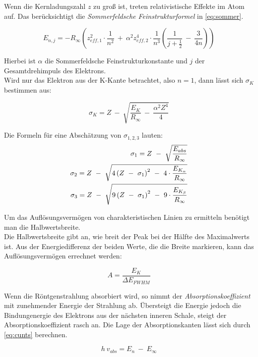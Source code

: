 Wenn die Kernladungszahl $z$ zu groß ist, treten relativistische Effekte im Atom auf.
Das berücksichtigt die \textit{Sommerfeldsche Feinstrukturformel} in \autoref{eq:sommer}.

\begin{equation}
    E_{n,j} = -R_{\infty}\left(z_{eff,1}^2\cdot \frac{1}{n^2}\ +\ \alpha^2z_{eff,2}^4\cdot\frac{1}{n^3}\left(\frac{1}{j+\frac{1}{2}}\ -\ \frac{3}{4n}\right)\right)
    \label{eq:sommer}
\end{equation}

Hierbei ist $\alpha$ die Sommerfeldsche Feinstrukturkonstante und $j$ der Gesamtdrehimpuls des Elektrons.\\
Wird nur das Elektron aus der K-Kante betrachtet, also $n=1$, dann lässt sich $\sigma_K$ bestimmen aus:

\begin{equation}
    \sigma_K = Z\ -\ \sqrt{\frac{E_K}{R_{\infty}}\ -\ \frac{\alpha^2Z^4}{4}}
    \label{eq:sigma}
\end{equation}

Die Formeln für eine Abschätzung von $\sigma_{1,2,3}$ lauten:
\begin{align}
    \sigma_1 = Z\ -\ \sqrt{\frac{E_{abs}}{R_{\infty}}} \notag \\
    \sigma_2 = Z\ -\ \sqrt{4\left(Z\ -\ \sigma_1\right)^2\ -\ 4\cdot \frac{E_{K_{\alpha}}}{R_{\infty}}} \label{sigma1}\\
    \sigma_3 = Z\ -\ \sqrt{9\left(Z\ -\ \sigma_1\right)^2\ -\ 9\cdot \frac{E_{K_{\beta}}}{R_{\infty}}} \notag
\end{align}

Um das Auflösungsvermögen von charakteristischen Linien zu ermitteln benötigt man die Halbwertsbreite.\\
Die Halbwertsbreite gibt an, wie breit der Peak bei der Hälfte des Maximalwerts ist. 
Aus der Energiedifferenz der beiden Werte, die die Breite markieren, kann das Auflösungsvermögen errechnet werden:

\begin{equation}
    A = \frac{E_K}{\Delta E_{FWHM}}
    \label{eq:aufloes}
\end{equation}

Wenn die Röntgenstrahlung absorbiert wird, so nimmt der \textit{Absorptionskoeffizient} mit zunehmender Energie der Strahlung ab.
Übersteigt die Energie jedoch die Bindungenergie des Elektrons aus der nächsten inneren Schale, steigt der Absorptionskoeffizient rasch an.
Die Lage der Absorptionskanten lässt sich durch \autoref{eq:cunts} berechnen.

\begin{equation}
    h\ v_{abs} = E_n\ -\ E_{\infty}
    \label{eq:cunts}
\end{equation}

